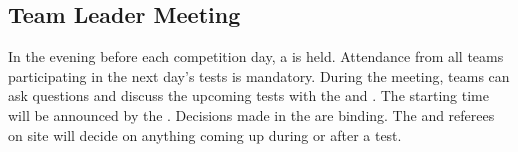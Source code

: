 









\subsection{Team Leader Meeting}
\label{sec:rules:teamleadermeeting}
In the evening before each competition day, a \TLM{} is held. Attendance from all teams participating in the next day's tests is mandatory. During the meeting, teams can ask questions and discuss the upcoming tests with the  and . The starting time will be announced by the . Decisions made in the \TLM{} are binding. The  and referees on site will decide on anything coming up during or after a test.

